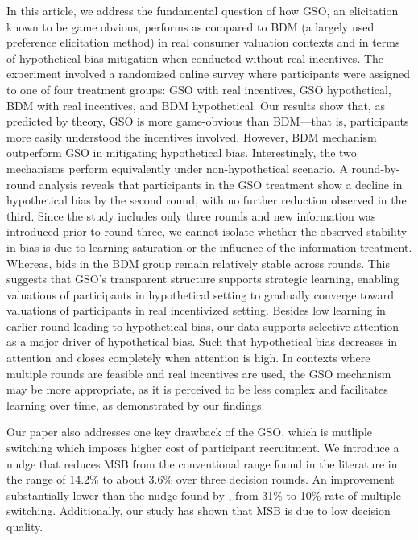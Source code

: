 \documentclass[12pt]{article}
\begin{document}
In this article, we address the fundamental question of how GSO, an elicitation known to be game obvious, performs as compared to BDM (a largely used preference elicitation method) in real consumer valuation contexts and in terms of hypothetical bias mitigation when conducted without real incentives. The experiment involved a randomized online survey where participants were assigned to one of four treatment groups: GSO with real incentives, GSO hypothetical, BDM with real incentives, and BDM hypothetical. Our results show that, as predicted by theory, GSO is more game-obvious than BDM—that is, participants more easily understood the incentives involved. However, BDM mechanism outperform GSO in mitigating hypothetical bias. Interestingly, the two mechanisms perform equivalently under non-hypothetical scenario. A round-by-round analysis reveals that participants in the GSO treatment show a decline in hypothetical bias by the second round, with no further reduction observed in the third. Since the study includes only three rounds and new information was introduced prior to round three, we cannot isolate whether the observed stability in bias is due to learning saturation or the influence of the information treatment. Whereas, bids in the BDM group remain relatively stable across rounds. This suggests that GSO’s transparent structure supports strategic learning, enabling valuations of participants in hypothetical setting to gradually converge toward valuations of participants in real incentivized setting. 
Besides low learning in earlier round leading to hypothetical bias, our data supports selective attention as a major driver of hypothetical bias. Such that hypothetical bias decreases in attention and closes completely when attention is high. 
In contexts where multiple rounds are feasible and real incentives are used, the GSO mechanism may be more appropriate, as it is perceived to be less complex and facilitates learning over time, as demonstrated by our findings.

Our paper also addresses one key drawback of the GSO, which is mutliple switching which imposes higher cost of participant recruitment. We introduce a nudge that reduces MSB from the conventional range found in the literature in the range of 14.2\% to about 3.6\% over three decision rounds. An improvement substantially lower than the nudge found by \citet{yu2021multiple}, from 31\% to 10\% rate of multiple switching. Additionally, our study has shown that MSB is due to low decision quality.
\end{document}
